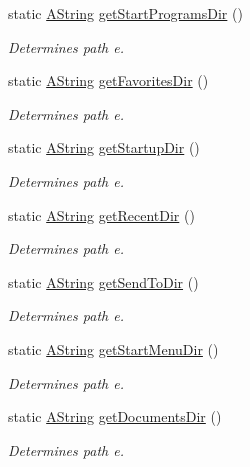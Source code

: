 \begin{DoxyCompactItemize}
static \mbox{\hyperlink{class_a_string}{A\+String}} \mbox{\hyperlink{class_dir_a40e95392ecac9f2f4802555d2427a4e8}{get\+Start\+Programs\+Dir}} ()
\begin{DoxyCompactList}\small\item\em Determines path e. \end{DoxyCompactList}\item 
static \mbox{\hyperlink{class_a_string}{A\+String}} \mbox{\hyperlink{class_dir_a858ffe5732fe3aac5c3fecdf3323c3db}{get\+Favorites\+Dir}} ()
\begin{DoxyCompactList}\small\item\em Determines path e. \end{DoxyCompactList}\item 
static \mbox{\hyperlink{class_a_string}{A\+String}} \mbox{\hyperlink{class_dir_a17a1c814df49732ac4002a122476bf26}{get\+Startup\+Dir}} ()
\begin{DoxyCompactList}\small\item\em Determines path e. \end{DoxyCompactList}\item 
static \mbox{\hyperlink{class_a_string}{A\+String}} \mbox{\hyperlink{class_dir_ae1d13db09743697eaa742c338fbdb36a}{get\+Recent\+Dir}} ()
\begin{DoxyCompactList}\small\item\em Determines path e. \end{DoxyCompactList}\item 
static \mbox{\hyperlink{class_a_string}{A\+String}} \mbox{\hyperlink{class_dir_af4da4485967970856d4691dc9eba0f00}{get\+Send\+To\+Dir}} ()
\begin{DoxyCompactList}\small\item\em Determines path e. \end{DoxyCompactList}\item 
static \mbox{\hyperlink{class_a_string}{A\+String}} \mbox{\hyperlink{class_dir_af0b763248a679d7e44c73da89fec7f79}{get\+Start\+Menu\+Dir}} ()
\begin{DoxyCompactList}\small\item\em Determines path e. \end{DoxyCompactList}\item 
static \mbox{\hyperlink{class_a_string}{A\+String}} \mbox{\hyperlink{class_dir_aab57bdc26a523e9476057d46825b109c}{get\+Documents\+Dir}} ()
\begin{DoxyCompactList}\small\item\em Determines path e. \end{DoxyCompactList}\item 

\end{DoxyCompactItemize}
